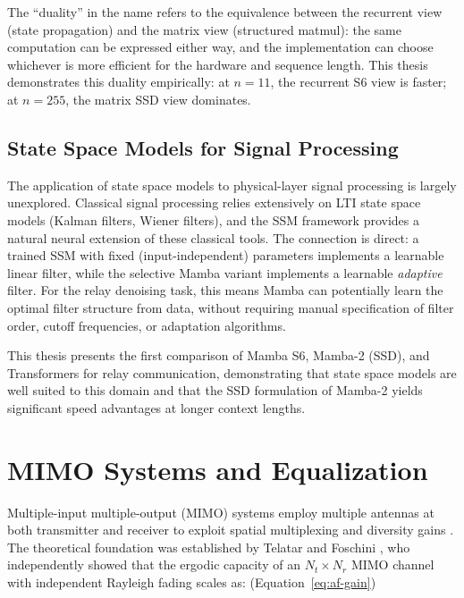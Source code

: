 The ``duality'' in the name refers to the equivalence between the recurrent view (state propagation) and the matrix view (structured matmul): the same computation can be expressed either way, and the implementation can choose whichever is more efficient for the hardware and sequence length. This thesis demonstrates this duality empirically: at \(n = 11\), the recurrent S6 view is faster; at \(n = 255\), the matrix SSD view dominates.

\subsection{State Space Models for Signal Processing}\label{sec:state-space-models-for-signal-processing}

The application of state space models to physical-layer signal processing is largely unexplored. Classical signal processing relies extensively on LTI state space models (Kalman filters, Wiener filters), and the SSM framework provides a natural neural extension of these classical tools. The connection is direct: a trained SSM with fixed (input-independent) parameters implements a learnable linear filter, while the selective Mamba variant implements a learnable \emph{adaptive} filter. For the relay denoising task, this means Mamba can potentially learn the optimal filter structure from data, without requiring manual specification of filter order, cutoff frequencies, or adaptation algorithms.

This thesis presents the first comparison of Mamba S6, Mamba-2 (SSD), and Transformers for relay communication, demonstrating that state space models are well suited to this domain and that the SSD formulation of Mamba-2 yields significant speed advantages at longer context lengths.

\section{MIMO Systems and Equalization}\label{sec:mimo-systems-and-equalization}

Multiple-input multiple-output (MIMO) systems employ multiple antennas at both transmitter and receiver to exploit spatial multiplexing and diversity gains \cite{TseViswanath2005Fundamentals}. The theoretical foundation was established by Telatar \cite{Telatar1999MIMO} and Foschini \cite{Foschini1996LayeredST}, who independently showed that the ergodic capacity of an \(N_t \times N_r\) MIMO channel with independent Rayleigh fading scales as: (Equation~\ref{eq:af-gain})


